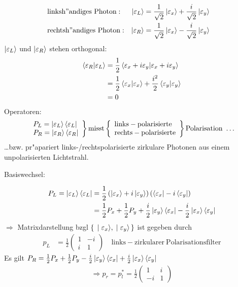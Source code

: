 \documentclass[a4paper]{scrartcl}
\newcommand{\eps}{\ensuremath \varepsilon}
\begin{document}
{\begin{align}
& \mathrm{linksh"andiges \ Photon:} &  \ket {\varepsilon_L } & = \frac1{\sqrt2} \ket{\varepsilon_x} + \frac i {\sqrt2} \ket{\varepsilon_y} &  &\\
& \mathrm{rechtsh"andiges \ Photon:} & \ket {\varepsilon_R } & = \frac1{\sqrt2} \ket{\varepsilon_x} - \frac i {\sqrt2} \ket{\varepsilon_y} 
\end{align}
$\ket {\varepsilon_L}$ und $\ket{\varepsilon_R}$ stehen orthogonal:
\begin{align}
\begin{split}
\braket{ \varepsilon_R | \varepsilon_L} & = \frac12 \braket{ \varepsilon_x + i \varepsilon_y | \varepsilon_x + i \varepsilon_y } \\
& = \frac12 \braket{ \varepsilon_x | \varepsilon_x } + \frac{i^2}2 \braket{\eps_y | \eps_y} \\
& = 0 
\end{split}
\end{align}
Operatoren: 
\begin{align}
\left.
\begin{array}{l}
P_L = \ket{ \eps_L} \bra{ \eps_L} \\
P_R = \ket{ \eps_R} \bra {\eps_R} 
\end{array}
\right\}
\mathrm{ misst } \left\{
\begin{array}{l}
\mathrm{links-polarisierte}\\
\mathrm{rechts-polarisierte}
\end{array}
\right\} 
\mathrm{ Polarisation \ \ldots}
\end{align}
\ldots bzw. pr"apariert links-/rechtspolarisierte zirkulare Photonen aus einem unpolarisierten Lichtstrahl.

Basiswechsel:

\begin{align}
\begin{split}
P_L = \ket{\eps_L} \bra{\eps_L} & = \frac 12 \left( \ket {\eps_x } + i \ket{ \eps_y} \right) \left( \bra{\eps_x} - i \bra{\eps_y} \right) \\
& = \frac12 P_x + \frac12 P_y + \frac i 2 \ket {\eps_y}\bra{\eps_x} - \frac i 2 \ket{ \eps_x } \bra {\eps_y}
\end{split}
\end{align}
$\Longrightarrow$ Matrixdarstellung bzgl $\set{ \ket{ \eps_x}, \ket{ \eps_y}}$ ist gegeben durch 
\begin{align}
p_L & = \frac12 \begin{pmatrix} 1 & -i \\ i & 1 \end{pmatrix} \quad \mathrm{ links-zirkularer \ Polarisationsfilter}
\end{align}
Es gilt $P_R = \frac12 P_x + \frac12 P_y - \frac i2 \ket{\eps_y}  \bra{ \eps_x} + \frac i2 \ket{ \eps_x} \bra{ \eps_y}$
\begin{align}
\Longrightarrow p_r = p_l^* = \frac12 \begin{pmatrix} 1 & i \\ -i & 1 \end{pmatrix}
\end{align}

}
\end{document}
